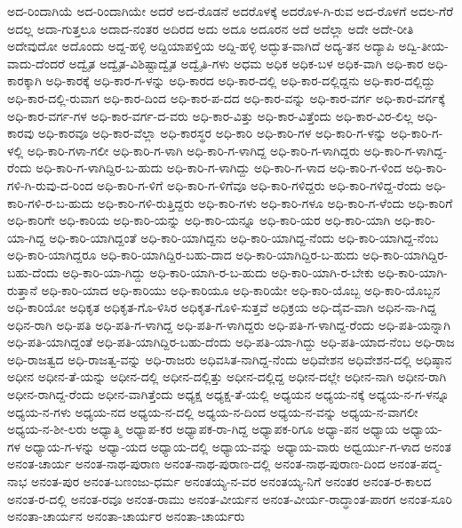 ಅದ-ರಿಂದಾಗಿಯೆ
ಅದ-ರಿಂದಾಗಿಯೇ
ಅದರೆ
ಅದ-ರೊಡನೆ
ಅದರೊಳಕ್ಕೆ
ಅದರೊಳ-ಗಿ-ರುವ
ಅದ-ರೊಳಗೆ
ಅದಲ-ಗೆರೆ
ಅದಲ್ಲ
ಅದಾ-ಗುತ್ತಲೂ
ಅದಾದ-ನಂತರ
ಅದಿರದ
ಅದು
ಅದೂ
ಅದೂರನ
ಅದೆ
ಅದೆಲ್ಲಾ
ಅದೇ
ಅದೇ-ರೀತಿ
ಅದೇವುದೋ
ಅದೊಂದು
ಅದ್ದ-ಹಳ್ಳಿ
ಅದ್ದಿಯಾಪಳ್ತಿಯ
ಅದ್ದಿ-ಹಳ್ಳಿ
ಅದ್ಭುತ-ವಾಗಿದೆ
ಅದ್ಯ-ತನ
ಅದ್ಯಾಪಿ
ಅದ್ವಿ-ತೀಯ-ವಾದು-ದೆಂದರೆ
ಅದ್ವೈತ
ಅದ್ವೈತ-ವಿಶಿಷ್ಟಾದ್ವೈತ
ಅದ್ವೈತಿ-ಗಳು
ಅಧಮ
ಅಧಿಕ
ಅಧಿಕ-ಬಳ
ಅಧಿಕ-ವಾಗಿ
ಅಧಿ-ಕಾರ
ಅಧಿ-ಕಾರಕ್ಕಾಗಿ
ಅಧಿ-ಕಾರಕ್ಕೆ
ಅಧಿ-ಕಾರ-ಗ-ಳನ್ನು
ಅಧಿ-ಕಾರದ
ಅಧಿ-ಕಾರ-ದಲ್ಲಿ
ಅಧಿ-ಕಾರ-ದಲ್ಲಿದ್ದನು
ಅಧಿ-ಕಾರ-ದಲ್ಲಿದ್ದು
ಅಧಿ-ಕಾರ-ದಲ್ಲಿ-ರುವಾಗ
ಅಧಿ-ಕಾರ-ದಿಂದ
ಅಧಿ-ಕಾರ-ಪ-ದದ
ಅಧಿ-ಕಾರ-ವನ್ನು
ಅಧಿ-ಕಾರ-ವರ್ಗ
ಅಧಿ-ಕಾರ-ವರ್ಗಕ್ಕೆ
ಅಧಿ-ಕಾರ-ವರ್ಗ-ಗಳ
ಅಧಿ-ಕಾರ-ವರ್ಗ-ದ-ವರು
ಅಧಿ-ಕಾರ-ವಿತ್ತು
ಅಧಿ-ಕಾರ-ವಿತ್ತೆಂದು
ಅಧಿ-ಕಾರ-ವಿರ-ಲಿಲ್ಲ
ಅಧಿ-ಕಾರವು
ಅಧಿ-ಕಾರವೂ
ಅಧಿ-ಕಾರ-ವೆಲ್ಲಾ
ಅಧಿ-ಕಾರಸ್ಥರ
ಅಧಿ-ಕಾರಿ
ಅಧಿ-ಕಾರಿ-ಗಳ
ಅಧಿ-ಕಾರಿ-ಗ-ಳನ್ನು
ಅಧಿ-ಕಾರಿ-ಗ-ಳಲ್ಲಿ
ಅಧಿ-ಕಾರಿ-ಗಳಾ-ಗಲೀ
ಅಧಿ-ಕಾರಿ-ಗ-ಳಾಗಿ
ಅಧಿ-ಕಾರಿ-ಗ-ಳಾಗಿದ್ದ
ಅಧಿ-ಕಾರಿ-ಗ-ಳಾಗಿದ್ದರು
ಅಧಿ-ಕಾರಿ-ಗ-ಳಾಗಿದ್ದ-ರೆಂದು
ಅಧಿ-ಕಾರಿ-ಗ-ಳಾಗಿದ್ದಿರ-ಬ-ಹುದು
ಅಧಿ-ಕಾರಿ-ಗ-ಳಾಗಿದ್ದು
ಅಧಿ-ಕಾರಿ-ಗ-ಳಾದ
ಅಧಿ-ಕಾರಿ-ಗ-ಳಿಂದ
ಅಧಿ-ಕಾರಿ-ಗಳಿ-ಗಿ-ರುವು-ದ-ರಿಂದ
ಅಧಿ-ಕಾರಿ-ಗ-ಳಿಗೆ
ಅಧಿ-ಕಾರಿ-ಗ-ಳಿಗೆವೂ
ಅಧಿ-ಕಾರಿ-ಗಳಿದ್ದರು
ಅಧಿ-ಕಾರಿ-ಗಳಿದ್ದ-ರೆಂದು
ಅಧಿ-ಕಾರಿ-ಗಳಿ-ರ-ಬ-ಹುದು
ಅಧಿ-ಕಾರಿ-ಗಳಿ-ರುತ್ತಿದ್ದರು
ಅಧಿ-ಕಾರಿ-ಗಳು
ಅಧಿ-ಕಾರಿ-ಗಳೂ
ಅಧಿ-ಕಾರಿ-ಗ-ಳೆಂದು
ಅಧಿ-ಕಾರಿಗೆ
ಅಧಿ-ಕಾರಿಗೇ
ಅಧಿ-ಕಾರಿಯ
ಅಧಿ-ಕಾರಿ-ಯನ್ನು
ಅಧಿ-ಕಾರಿ-ಯನ್ನೂ
ಅಧಿ-ಕಾರಿ-ಯರ
ಅಧಿ-ಕಾರಿ-ಯಾಗಿ
ಅಧಿ-ಕಾರಿ-ಯಾ-ಗಿದ್ದ
ಅಧಿ-ಕಾರಿ-ಯಾಗಿದ್ದಂತೆ
ಅಧಿ-ಕಾರಿ-ಯಾಗಿದ್ದನು
ಅಧಿ-ಕಾರಿ-ಯಾಗಿದ್ದ-ನೆಂದು
ಅಧಿ-ಕಾರಿ-ಯಾಗಿದ್ದ-ನೆಂಬ
ಅಧಿ-ಕಾರಿ-ಯಾಗಿದ್ದರೂ
ಅಧಿ-ಕಾರಿ-ಯಾಗಿದ್ದಿರ-ಬಹು-ದಾದ
ಅಧಿ-ಕಾರಿ-ಯಾಗಿದ್ದಿರ-ಬ-ಹುದು
ಅಧಿ-ಕಾರಿ-ಯಾಗಿದ್ದಿರ-ಬಹು-ದೆಂದು
ಅಧಿ-ಕಾರಿ-ಯಾ-ಗಿದ್ದು
ಅಧಿ-ಕಾರಿ-ಯಾಗಿ-ರ-ಬ-ಹುದು
ಅಧಿ-ಕಾರಿ-ಯಾಗಿ-ರ-ಬೇಕು
ಅಧಿ-ಕಾರಿ-ಯಾಗಿ-ರುತ್ತಾನೆ
ಅಧಿ-ಕಾರಿ-ಯಾದ
ಅಧಿ-ಕಾರಿಯು
ಅಧಿ-ಕಾರಿಯೂ
ಅಧಿ-ಕಾರಿಯೇ
ಅಧಿ-ಕಾರಿ-ಯೊಬ್ಬ
ಅಧಿ-ಕಾರಿ-ಯೊಬ್ಬನ
ಅಧಿ-ಕಾರಿಯೋ
ಅಧಿಕೃತ
ಅಧಿಕೃತ-ಗೊ-ಳಿಸಿರ
ಅಧಿಕೃತ-ಗೊಳಿ-ಸುತ್ತವೆ
ಅಧಿಕ್ರಯ
ಅಧಿ-ದೈವ-ವಾಗಿ
ಅಧಿನ-ನಾ-ಗಿದ್ದ
ಅಧಿನ-ರಾಗಿ
ಅಧಿ-ಪತಿ
ಅಧಿ-ಪತಿ-ಗ-ಳಾಗಿದ್ದ
ಅಧಿ-ಪತಿ-ಗ-ಳಾಗಿದ್ದರು
ಅಧಿ-ಪತಿ-ಗ-ಳಾಗಿದ್ದ-ರೆಂದು
ಅಧಿ-ಪತಿ-ಯನ್ನಾಗಿ
ಅಧಿ-ಪತಿ-ಯಾಗಿದ್ದಂತೆ
ಅಧಿ-ಪತಿ-ಯಾಗಿದ್ದಿರ-ಬಹು-ದೆಂದು
ಅಧಿ-ಪತಿ-ಯಾ-ಗಿದ್ದು
ಅಧಿ-ಪತಿ-ಯಾದ-ನೆಂಬ
ಅಧಿ-ರಾಜ
ಅಧಿ-ರಾಜತ್ವದ
ಅಧಿ-ರಾಜತ್ವ-ವನ್ನು
ಅಧಿ-ರಾಜರು
ಅಧಿವಸಿತ-ನಾಗಿದ್ದ-ನೆಂದು
ಅಧಿವೇಶನ
ಅಧಿವೇಶನ-ದಲ್ಲಿ
ಅಧಿಷ್ಠಾನ
ಅಧೀನ
ಅಧೀನ-ತೆ-ಯನ್ನು
ಅಧೀನ-ದಲ್ಲಿ
ಅಧೀನ-ದಲ್ಲಿತ್ತು
ಅಧೀನ-ದಲ್ಲಿದ್ದ
ಅಧೀನ-ದಲ್ಲೇ
ಅಧೀನ-ನಾಗಿ
ಅಧೀನ-ರಾಗಿ
ಅಧೀನ-ರಾಗಿದ್ದ-ರೆಂದು
ಅಧೀನ-ವಾಗಿತ್ತೆಂದು
ಅಧ್ಯಕ್ಷ
ಅಧ್ಯಕ್ಷ-ತೆ-ಯಲ್ಲಿ
ಅಧ್ಯಯನ
ಅಧ್ಯಯ-ನಕ್ಕೆ
ಅಧ್ಯಯ-ನ-ಗ-ಳನ್ನೂ
ಅಧ್ಯಯ-ನ-ಗಳು
ಅಧ್ಯಯ-ನದ
ಅಧ್ಯಯ-ನ-ದಲ್ಲಿ
ಅಧ್ಯಯ-ನ-ದಿಂದ
ಅಧ್ಯಯ-ನ-ವನ್ನು
ಅಧ್ಯಯ-ನ-ವಾಗಲೀ
ಅಧ್ಯಯ-ನ-ಶೀ-ಲರು
ಅಧ್ಯಾತ್ಮಿ
ಅಧ್ಯಾಪ-ಕರ
ಅಧ್ಯಾಪಕ-ರಾ-ಗಿದ್ದ
ಅಧ್ಯಾಪಕ-ರಿಗೂ
ಅಧ್ಯಾ-ಪನ
ಅಧ್ಯಾಯ
ಅಧ್ಯಾಯ-ಗಳ
ಅಧ್ಯಾಯ-ಗ-ಳನ್ನು
ಅಧ್ಯಾ-ಯದ
ಅಧ್ಯಾಯ-ದಲ್ಲಿ
ಅಧ್ಯಾಯ-ವನ್ನು
ಅಧ್ಯಾಯ-ವಾರು
ಅಧ್ವರ್ಯು-ಗ-ಳಾದ
ಅನಂತ
ಅನಂತ-ಚಾರ್ಯ
ಅನಂತ-ನಾಥ-ಪುರಾಣ
ಅನಂತ-ನಾಥ-ಪುರಾಣ-ದಲ್ಲಿ
ಅನಂತ-ನಾಥ-ಪುರಾಣ-ದಿಂದ
ಅನಂತ-ಪದ್ಮ-ನಾಭ
ಅನಂತ-ಪುರ
ಅನಂತ-ಬಣಂಜು-ಧರ್ಮ
ಅನಂತಯ್ಯ-ನ-ವರ
ಅನಂತಯ್ಯ-ನಿಗೆ
ಅನಂತರ
ಅನಂತ-ರ-ಕಾಲದ
ಅನಂತ-ರ-ದಲ್ಲಿ
ಅನಂತ-ರವೂ
ಅನಂತ-ರಾಮು
ಅನಂತ-ವೀರ್ಯನ
ಅನಂತ-ವೀರ್ಯ-ರಾದ್ಧಾಂತ-ಪಾರಗ
ಅನಂತ-ಸೂರಿ
ಅನಂತಾ-ಚಾರ್ಯನ
ಅನಂತಾ-ಚಾರ್ಯರ
ಅನಂತಾ-ಚಾರ್ಯರು
